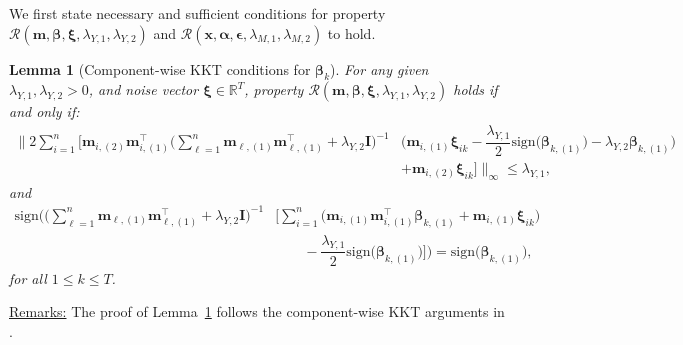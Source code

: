 \documentclass[
  12pt]{article}
\newtheorem{lem}[thm]{Lemma}
\def\R{\mathbb{R}}
\def\M{\mathbf{m}}
\def\X{\mathbf{x}}
\begin{document}
We first state necessary and sufficient conditions for property $\mathcal{R}(\M, \bm{\beta}, \bm{\xi},  \lambda_{Y,1},  \lambda_{Y,2})$ and $\mathcal{R}(\X, \bm{\alpha}, \bm{\epsilon}, \lambda_{M,1},  \lambda_{M,2})$  to hold.
\begin{lem} [Component-wise KKT conditions for $\bm{\beta}_k$]%

\label{lem:KKT-condition}
	For any given $\lambda_{Y,1},\lambda_{Y,2} > 0$, and noise vector $\bm{\xi} \in \R^{T}$, property $\mathcal{R}(\M, \bm{\beta}, \bm{\xi}, \lambda_{Y,1}, \lambda_{Y,2})$ holds if and only if:
	\em{  \begin{align}
			\Big\|  2  \sum_{i=1}^{n}  \Big[   \M_{i,(2)} \M_{i,(1)}^{\top}  \Big( \sum_{\ell = 1}^{n}  \M_{\ell , (1)} \M_{\ell , (1)}^{\top}  +  \lambda_{Y,2} \mathbf{I} \Big)^{-1}
			&\Big( \M_{i,(1)} \bm{\xi}_{ik}  -  \dfrac{\lambda_{Y,1}}{2} \textrm{sign} \big( \bm{\beta}_{k,(1)} \big)  -  \lambda_{Y,2} \bm{\beta}_{k,(1)} \Big)
			\nonumber
			\\
			&+  \M_{i,(2)}   \bm{\xi}_{ik}  \Big]   \Big\|_{\infty}
			\leq  \lambda_{Y,1},
			\label{lem:KKT-condition:condition1}
	\end{align} }
	and
	{  \begin{align}
			\textrm{sign} \Bigg(  \Big(  \sum_{\ell = 1}^{n} \M_{\ell,(1)}   \M_{\ell , (1)}^{\top}   +  \lambda_{Y,2} \mathbf{I}      \Big)^{-1}
			&\Big[   \sum_{i=1}^{n} \Big( \M_{i, (1)} \M_{i, (1)}^{\top}  \bm{\beta}_{k , (1)}  +  \M_{i,(1)}    \bm{\xi}_{ik}  \Big)
			\nonumber
			\\
			& \qquad  -   \dfrac{\lambda_{Y,1}}{2} \textrm{sign} \big( \bm{\beta}_{k,(1)} \big)  \Big]    \Bigg)  =  \textrm{sign} \big( \bm{\beta}_{k,(1)} \big) ,
			\label{lem:KKT-condition:condition2}
		\end{align}
		for all $1 \leq  k  \leq  T$. }
\end{lem}
\underline{Remarks:} The proof of Lemma~\ref{lem:KKT-condition} follows the component-wise KKT arguments in \citep{Jia-Yu:2010:model.consistency.elastic-net}.
\end{document}
